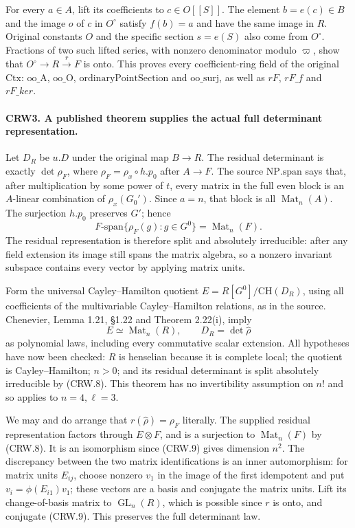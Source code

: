 For every $a\in A$, lift its coefficients to $c\in O[[S]]$.
The element $b=e(c)\in B$ and the image $o$ of $c$ in $O^\circ$
satisfy $f(b)=a$ and have the same image in $R$.
Original constants $O$ and the specific section $s=e(S)$ also
come from $O^\circ$.  Fractions of two such lifted series,
with nonzero denominator modulo $\varpi$, show that
$O^\circ\to R\xrightarrow r F$ is onto.  This proves every
coefficient-ring field of the original $\mathrm{Ctx}$:
$\mathrm{oo\_A}$, $\mathrm{oo\_O}$,
$\mathrm{ordinaryPointSection}$ and $\mathrm{oo\_surj}$,
as well as $rF$, $rF\_f$ and $rF\_ker$.

\paragraph{CRW3. A published theorem supplies the actual full determinant representation.}
\label{claim:CRW3}
Let $D_R$ be $u.D$ under the original map $B\to R$.
The residual determinant is exactly
$\det\rho_F$, where
$\rho_F=\rho_x\circ h.p_0$ after $A\to F$.
The source $\mathrm{NP.span}$ says that, after multiplication
by some power of $t$, every matrix in the full even block is
an $A$-linear combination of $\rho_x(G_0')$.
Since $a=n$, that block is all $\operatorname{Mat}_n(A)$.
The surjection $h.p_0$ preserves $G'$; hence
\[
 F\text{-span}\{\rho_F(g):g\in G^0\}
   =\operatorname{Mat}_n(F).                        \tag{CRW.8}
\]
The residual representation is therefore split and absolutely
irreducible: after any field extension its image still spans
the matrix algebra, so a nonzero invariant subspace contains
every vector by applying matrix units.

Form the universal Cayley--Hamilton quotient
$E=R[G^0]/\mathrm{CH}(D_R)$, using all coefficients of the
multivariable Cayley--Hamilton relations, as in the source.
Chenevier, Lemma 1.21, \S1.22 and Theorem 2.22(i), imply
\[
 E\simeq\operatorname{Mat}_n(R),\qquad D_R=\det\widehat\rho
                                                               \tag{CRW.9}
\]
as polynomial laws, including every commutative scalar extension.
All hypotheses have now been checked: $R$ is henselian because
it is complete local; the quotient is Cayley--Hamilton; $n>0$;
and its residual determinant is split absolutely irreducible by
(CRW.8).  This theorem has no invertibility assumption on $n!$
and so applies to $n=4,\ell=3$.

We may and do arrange that $r(\widehat\rho)=\rho_F$ literally.
The supplied residual representation factors through $E\otimes F$,
and is a surjection to $\operatorname{Mat}_n(F)$ by (CRW.8).
It is an isomorphism since (CRW.9) gives dimension $n^2$.
The discrepancy between the two matrix identifications is an
inner automorphism: for matrix units $E_{ij}$, choose nonzero
$v_1$ in the image of the first idempotent and put
$v_i=\phi(E_{i1})v_1$; these vectors are a basis and conjugate
the matrix units.  Lift its change-of-basis matrix to
$\operatorname{GL}_n(R)$, which is possible since $r$ is onto,
and conjugate (CRW.9).  This preserves the full determinant law.

